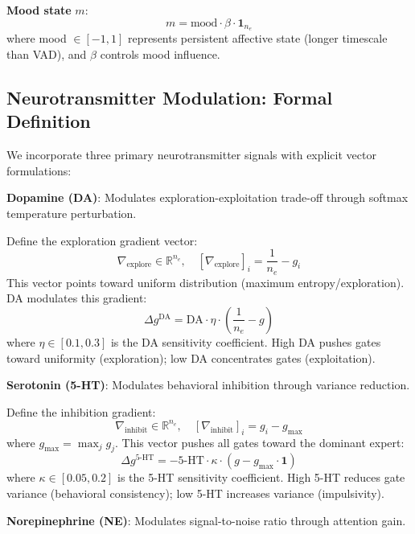\documentclass[preprint,12pt]{elsarticle}
\newcommand{\R}{\mathbb{R}}
\begin{document}
\textbf{Mood state} $m$:
\begin{equation}
m = \text{mood} \cdot \beta \cdot \mathbf{1}_{n_e}
\end{equation}
where mood $\in [-1,1]$ represents persistent affective state (longer timescale than VAD), and $\beta$ controls mood influence.

\subsection{Neurotransmitter Modulation: Formal Definition}

We incorporate three primary neurotransmitter signals with explicit vector formulations:

\textbf{Dopamine (DA)}: Modulates exploration-exploitation trade-off through softmax temperature perturbation.

Define the exploration gradient vector:
\begin{equation}
\nabla_{\text{explore}} \in \R^{n_e}, \quad [\nabla_{\text{explore}}]_i = \frac{1}{n_e} - g_i
\end{equation}
This vector points toward uniform distribution (maximum entropy/exploration). DA modulates this gradient:
\begin{equation}
\Delta g^{\text{DA}} = \text{DA} \cdot \eta \cdot \left(\frac{1}{n_e} - g\right)
\end{equation}
where $\eta \in [0.1, 0.3]$ is the DA sensitivity coefficient. High DA pushes gates toward uniformity (exploration); low DA concentrates gates (exploitation).

\textbf{Serotonin (5-HT)}: Modulates behavioral inhibition through variance reduction.

Define the inhibition gradient:
\begin{equation}
\nabla_{\text{inhibit}} \in \R^{n_e}, \quad [\nabla_{\text{inhibit}}]_i = g_i - g_{\max}
\end{equation}
where $g_{\max} = \max_j g_j$. This vector pushes all gates toward the dominant expert:
\begin{equation}
\Delta g^{\text{5-HT}} = -\text{5-HT} \cdot \kappa \cdot (g - g_{\max} \cdot \mathbf{1})
\end{equation}
where $\kappa \in [0.05, 0.2]$ is the 5-HT sensitivity coefficient. High 5-HT reduces gate variance (behavioral consistency); low 5-HT increases variance (impulsivity).

\textbf{Norepinephrine (NE)}: Modulates signal-to-noise ratio through attention gain.
\end{document}
